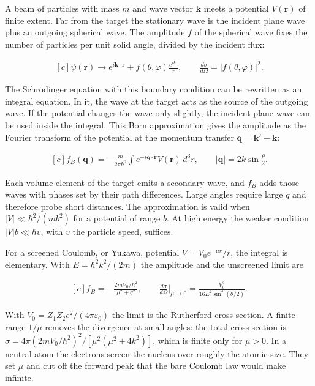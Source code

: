 \documentclass[11pt,oneside]{book}
\newenvironment{centeredalign}{\[\begin{gathered}[c]}{\end{gathered}\]}
\begin{document}
A beam of particles with mass \(m\) and wave vector \(\mathbf k\) meets a potential \(V(\mathbf r)\) of finite extent. Far from the target the stationary wave is the incident plane wave plus an outgoing spherical wave. The amplitude \(f\) of the spherical wave fixes the number of particles per unit solid angle, divided by the incident flux:

\begin{centeredalign}
\psi(\mathbf r)\to e^{i\mathbf k\cdot\mathbf r}+f(\theta,\varphi)\frac{e^{ikr}}{r},\qquad
\frac{d\sigma}{d\Omega}=|f(\theta,\varphi)|^2.
\end{centeredalign}

The Schrödinger equation with this boundary condition can be rewritten as an integral equation. In it, the wave at the target acts as the source of the outgoing wave. If the potential changes the wave only slightly, the incident plane wave can be used inside the integral. This Born approximation gives the amplitude as the Fourier transform of the potential at the momentum transfer \(\mathbf q=\mathbf k'-\mathbf k\):

\begin{centeredalign}
f_B(\mathbf q)=-\frac{m}{2\pi\hbar^2}\int e^{-i\mathbf q\cdot\mathbf r}V(\mathbf r)\,d^3r,
\qquad |\mathbf q|=2k\sin\frac\theta2.
\end{centeredalign}

Each volume element of the target emits a secondary wave, and \(f_B\) adds those waves with phases set by their path differences. Large angles require large \(q\) and therefore probe short distances. The approximation is valid when \(|V|\ll\hbar^2/(mb^2)\) for a potential of range \(b\). At high energy the weaker condition \(|V|b\ll\hbar v\), with \(v\) the particle speed, suffices.

For a screened Coulomb, or Yukawa, potential \(V=V_0e^{-\mu r}/r\), the integral is elementary. With \(E=\hbar^2k^2/(2m)\) the amplitude and the unscreened limit are

\begin{centeredalign}
f_B=-\frac{2mV_0/\hbar^2}{\mu^2+q^2},\qquad
\frac{d\sigma}{d\Omega}\Big|_{\mu\to0}=\frac{V_0^2}{16E^2\sin^4(\theta/2)}.
\end{centeredalign}

With \(V_0=Z_1Z_2e^2/(4\pi\varepsilon_0)\) the limit is the Rutherford cross-section. A finite range \(1/\mu\) removes the divergence at small angles: the total cross-section is \(\sigma=4\pi(2mV_0/\hbar^2)^2/[\mu^2(\mu^2+4k^2)]\), which is finite only for \(\mu>0\). In a neutral atom the electrons screen the nucleus over roughly the atomic size. They set \(\mu\) and cut off the forward peak that the bare Coulomb law would make infinite.
\end{document}
